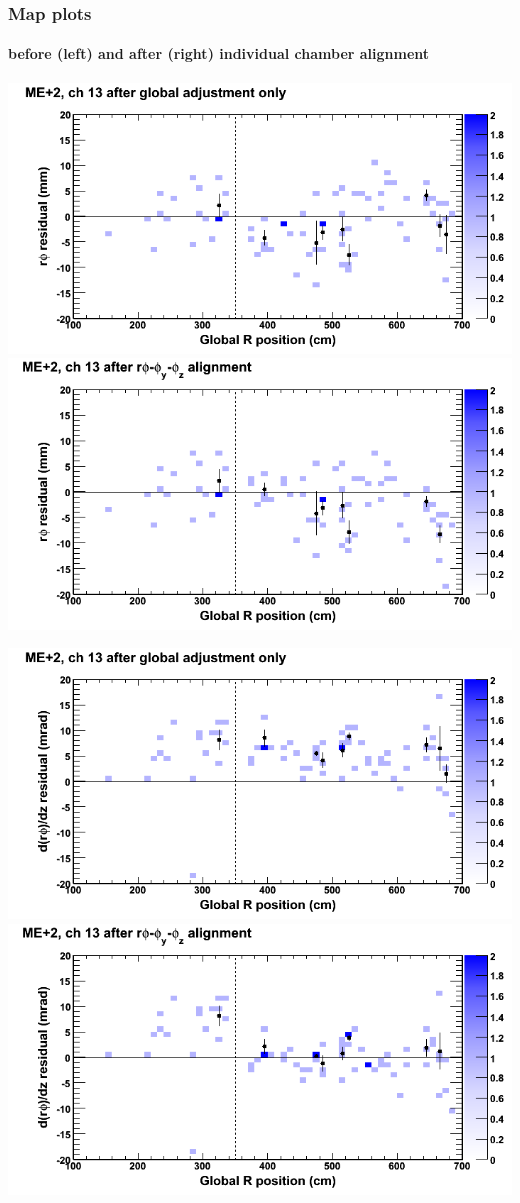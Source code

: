 \documentclass[compress]{beamer}
\begin{document}
\begin{frame}
\frametitle{Map plots}
\framesubtitle{before (left) and after (right) individual chamber alignment}
\includegraphics[width=0.5\linewidth]{ringmapplots_3dof/before_CSCvsr_mep2ch13_x.png} \includegraphics[width=0.5\linewidth]{ringmapplots_3dof/after_CSCvsr_mep2ch13_x.png}

\includegraphics[width=0.5\linewidth]{ringmapplots_3dof/before_CSCvsr_mep2ch13_dxdz.png} \includegraphics[width=0.5\linewidth]{ringmapplots_3dof/after_CSCvsr_mep2ch13_dxdz.png}
\end{frame}
\end{document}
